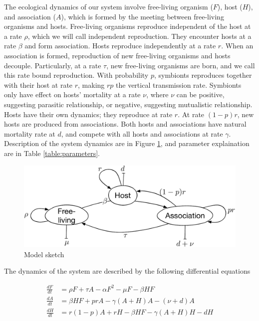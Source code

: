 \documentclass[11pt]{article}
\begin{document}
The ecological dynamics of our system involve free-living organism ($F$), host ($H$), and association ($A$), which is formed by the meeting between free-living organisms and hosts. Free-living organisms reproduce independent of the host at a rate $\rho$, which we will call independent reproduction. They encounter hosts at a rate $\beta$ and form association. Hosts reproduce independently at a rate $r$. When an association is formed, reproduction of new free-living organisms and hosts decouple. Particularly, at a rate $\tau$, new free-living organisms are born, and we call this rate bound reproduction. With probability $p$, symbionts reproduces together with their host at rate $r$, making $r p$ the vertical transmission rate. Symbionts only have effect on hosts' mortality at a rate $\nu$, where $\nu$ can be positive, suggesting parasitic relationship, or negative, suggesting mutualistic relationship. Hosts have their own dynamics; they reproduce at rate $r$. At rate $(1-p)r$, new hosts are produced from associations. Both hosts and associations have natural mortality rate at $d$, and compete with all hosts and associations at rate $\gamma$. Description of the system dynamics are in Figure \ref{Fig:model_sketch}, and  parameter explaination are in Table \ref{table:parameters}. 

\begin{figure}[ht!]
	\centering
	\includegraphics[width=0.7 \linewidth]{model_sketch}
	\caption{Model sketch}
	\label{Fig:model_sketch}
\end{figure}

The dynamics of the system are described by the following differential equations

\begin{align}
	\frac{dF}{dt}     & = \rho F +\tau A - \alpha F^2 - \mu F - \beta H F \\
	\frac{dA}{dt}    & = \beta H F +  p r A - \gamma (A + H) A - (\nu + d)  A \\
	\frac{dH}{dt}    & = r (1 - p) A + r  H -\beta H F   - \gamma (A + H) H - d H 
\end{align}
\end{document}
